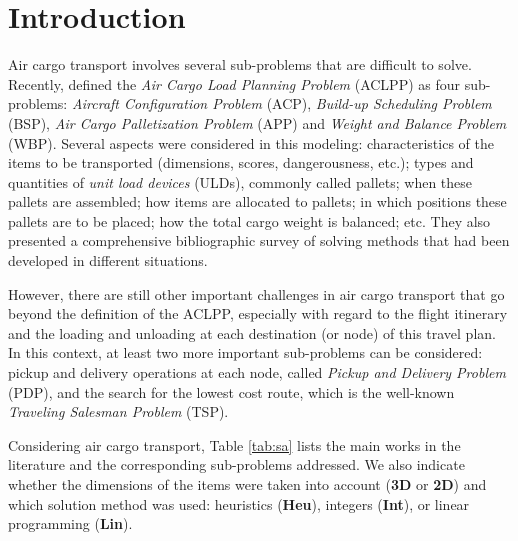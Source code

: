 \documentclass[preprint,authoryear]{elsarticle}
\begin{document}
\label{sec1}
\section{Introduction}


Air cargo transport involves several sub-problems that are difficult to solve. Recently, \cite[p. 401]{BrandtStefan2019} defined the {\it Air Cargo Load Planning Problem} (ACLPP) as four sub-problems: {\it Aircraft Configuration Problem} (ACP), {\it Build-up Scheduling Problem} (BSP), {\it Air Cargo Palletization Problem} (APP) and {\it Weight and Balance Problem} (WBP). Several aspects were considered in this modeling: characteristics of the items to be transported (dimensions, scores, dangerousness, etc.); types and quantities of {\it unit load devices} (ULDs), commonly called pallets; when these pallets are assembled; how items are allocated to pallets; in which positions these pallets are to be placed; how the total cargo weight is balanced; etc. They also presented a comprehensive bibliographic survey of solving methods that had been developed in different situations.

However, there are still other important challenges in air cargo transport that go beyond the definition of the ACLPP, especially with regard to the flight itinerary and the loading and unloading at each destination (or node) of this travel plan. In this context, at least two more important sub-problems can be considered: pickup and delivery operations at each node, called {\it Pickup and Delivery Problem} (PDP), and the search for the lowest cost route, which is the well-known {\it Traveling Salesman Problem} (TSP).

Considering air cargo transport, Table \ref{tab:sa} lists the main works in the literature and the corresponding sub-problems addressed. We also indicate whether the dimensions of the items were taken into account ({\bf 3D} or {\bf 2D}) and which solution method was used: heuristics ({\bf Heu}), integers ({\bf Int}), or linear programming ({\bf Lin}).
\end{document}
